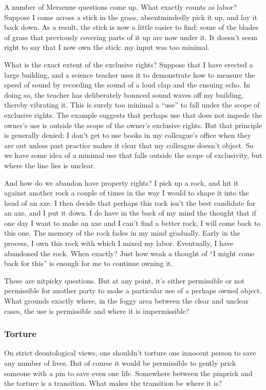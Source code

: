 A number of Mersenne questions come up. What exactly counts as labor? Suppose I come across a stick in 
the grass, absentmindedly pick it up, and lay it back down. As a result, the stick is now a little easier to find: some of 
the blades of grass that previously covering parts of it up are now under it. It doesn't seem right to say that I now own
the stick: my input was too minimal. 

What is the exact extent of the exclusive rights? Suppose that I have erected a large 
building, and a science teacher uses it to demonstrate how to measure the speed of sound by recording the sound of a loud 
clap and the ensuing echo. In doing so, the teacher has deliberately bounced sound waves off my building, thereby vibrating 
it. This is surely too minimal a ``use'' to fall under the scope of exclusive rights. The example suggests that perhaps use that 
does not impede the owner's use is outside the scope of the owner's exclusive rights. But that principle is generally 
denied: I don't get to use books in my colleague's office when they are out unless past practice makes it clear that my 
colleague doesn't object. So we have some idea of a minimal use that falls outside the scope of exclusivity, but where the 
line lies is unclear.

And how do we abandon have property rights? I pick up a rock, and hit it against another rock a couple of times in the way
I would to shape it into the head of an axe. I then decide that perhaps this rock isn't the best candidate for an axe, and I
put it down. I do have in the back of my mind the thought that if one day I want to make an axe and I can't find a better 
rock, I will come back to this one. The memory of the rock fades in my mind gradually. Early in the process, I own this 
rock with which I mixed my labor. Eventually, I have abandoned the rock. When exactly? Just how weak a thought of ``I might 
come back for this'' is enough for me to continue owning it. 

These are nitpicky questions. But at any point, it's either permissible or not permissible for another party to make a 
particular use of a perhaps owned object. What grounds exactly where, in the foggy area between the clear and unclear cases, the
use is permissible and where it is impermissible? 

\subsubsection{Torture}
On strict deontological views, one shouldn't torture one innocent person to save any number of lives. But of course
it would be permissible to gently prick someone with a pin to save even one life. Somewhere between the pinprick
and the torture is a transition. What makes the transition be where it is?

